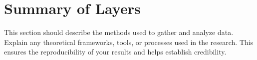 \section{Summary of Layers}
This section should describe the methods used to gather and analyze data. Explain any theoretical frameworks, tools, or processes used in the research. This ensures the reproducibility of your results and helps establish credibility.

\section{}